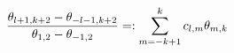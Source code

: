 \begin{equation}
  { \theta_{l+1,k+2}- \theta_{-l-1,k+2} \over \theta_{1,2}-
  \theta_{-1,2} } =: \sum_{m=-k+1}^k c_{l,m} \theta_{m,k}
\end{equation}

